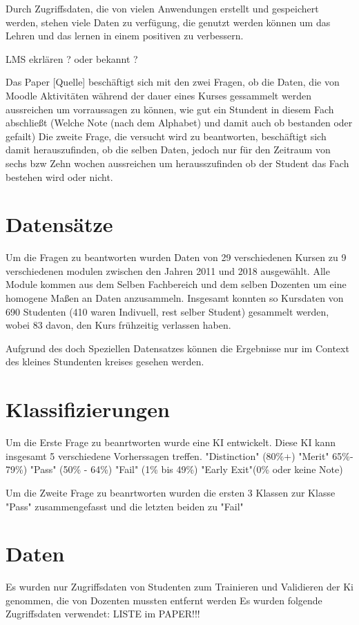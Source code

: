 

Durch Zugriffsdaten, die von vielen Anwendungen erstellt und gespeichert werden, stehen viele Daten zu verfügung,
die genutzt werden können um das Lehren und das lernen in einem positiven zu verbessern.

LMS ekrlären ? oder bekannt ?

Das Paper [Quelle] beschäftigt sich mit den zwei Fragen, ob die Daten, die von Moodle Aktivitäten während
der dauer eines Kurses gessammelt werden aussreichen um vorraussagen zu können, wie gut ein Stundent in diesem Fach abschließt (Welche Note (nach dem Alphabet) und damit auch ob bestanden oder gefailt)
Die zweite Frage, die versucht wird zu beantworten, beschäftigt sich damit herauszufinden, ob die selben Daten, jedoch 
nur für den Zeitraum von sechs bzw Zehn wochen aussreichen um herausszufinden ob der Student das Fach bestehen wird oder nicht.

\section*{Datensätze}
Um die Fragen zu beantworten wurden Daten von 29 verschiedenen Kursen zu 9 verschiedenen modulen zwischen den Jahren 2011 und 2018 ausgewählt.
Alle Module kommen aus dem Selben Fachbereich und dem selben Dozenten um eine homogene Maßen an Daten anzusammeln.
Insgesamt konnten so Kursdaten von 690 Studenten (410 waren Indivuell, rest selber Student) gesammelt werden, wobei 83 davon, den Kurs frühzeitig verlassen haben.

Aufgrund des doch Speziellen Datensatzes können die Ergebnisse nur im Context des kleines Stundenten kreises gesehen werden.



\section{Klassifizierungen}
Um die Erste Frage zu beanrtworten wurde eine KI entwickelt. Diese KI kann insgesamt 5 verschiedene Vorherssagen treffen.
"Distinction" (80\%+)
"Merit" 65\%- 79\%)
"Pass" (50\% - 64\%)
"Fail" (1\% bis 49\%)
"Early Exit"(0\% oder keine Note)

Um die Zweite Frage zu beanrtworten wurden die ersten 3 Klassen zur Klasse "Pass" zusammengefasst und die letzten beiden zu "Fail"

\section{Daten}
Es wurden nur Zugriffsdaten von Studenten zum Trainieren und Validieren der Ki genommen, die von Dozenten mussten entfernt werden
Es wurden folgende Zugriffsdaten verwendet: LISTE im PAPER!!!

